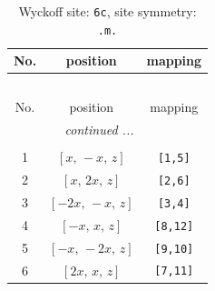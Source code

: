 \documentclass[fleqn,8pt]{jsarticle}
\begin{document}
\renewcommand{\arraystretch}{1.2}
\begin{longtable}{ccc}
\caption{Wyckoff site: {\tt 6c}, site symmetry: {\tt .m.}}
 \\
 \hline \hline
No. & position & mapping \\ \hline \endfirsthead

\multicolumn{2}{l}{\tablename\ \thetable{}} \\
 \hline \hline
No. & position & mapping \\ \hline \endhead

 \hline \hline
\multicolumn{2}{r}{\footnotesize\it continued ...} \\ \endfoot

 \hline \hline
\multicolumn{2}{r}{} \\ \endlastfoot

1 & $\left[ x,\, - x,\, z \right]$ & {\tt [1,5]} \\ \hline
2 & $\left[ x,\, 2 x,\, z \right]$ & {\tt [2,6]} \\ \hline
3 & $\left[ - 2 x,\, - x,\, z \right]$ & {\tt [3,4]} \\ \hline
4 & $\left[ - x,\, x,\, z \right]$ & {\tt [8,12]} \\ \hline
5 & $\left[ - x,\, - 2 x,\, z \right]$ & {\tt [9,10]} \\ \hline
6 & $\left[ 2 x,\, x,\, z \right]$ & {\tt [7,11]} \\
\end{longtable}
\renewcommand{\arraystretch}{1.2}
\end{document}
